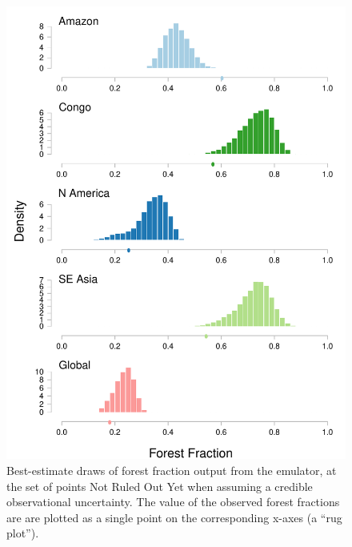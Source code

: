 \documentclass[esd, manuscript]{copernicus}
\begin{document}
\begin{figure}[t]
\includegraphics[width=12cm]{graphics/credible_NROY_hists.pdf}
\caption{Best-estimate draws of forest fraction output from the emulator, at the set of points Not Ruled Out Yet when assuming a credible observational uncertainty. The value of the observed forest fractions are are plotted as a single point on the corresponding x-axes (a ``rug plot'').}
\label{fig:credible_NROY_hists}
\end{figure}
\end{document}
